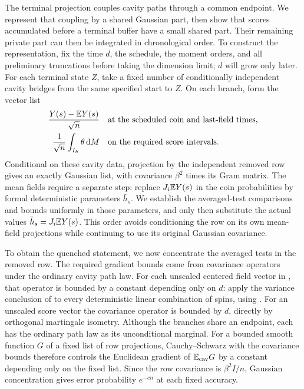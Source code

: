 The terminal projection couples cavity paths through a common endpoint.
We represent that coupling by a shared Gaussian part, then show that
scores accumulated before a terminal buffer have a small shared part.
Their remaining private part can then be integrated in chronological
order. To construct the representation, fix the time $d$, the schedule, the moment
orders, and all preliminary truncations before taking the dimension
limit; $d$ will grow only later.  For each terminal state $Z$, take a
fixed number of conditionally independent cavity bridges from the same
specified start to $Z$.  On each branch, form the vector list
\begin{equation}
 \begin{aligned}
 \frac{Y(s)-\mathbb E Y(s)}{\sqrt n}\quad
       &\text{at the scheduled coin and last-field times},\\
 \frac1{\sqrt n}\int_{I_h}\theta\,\mathrm d M
       \quad&\text{on the required score intervals}.
 \end{aligned}
 \label{eq:row-bridge-list}
\end{equation}
Conditional on these cavity data, projection by the independent removed
row gives an exactly Gaussian list, with covariance $\beta^2$ times
its Gram matrix.  The mean fields require a separate step: replace
$J_i\mathbb E Y(s)$ in the coin probabilities by formal deterministic
parameters $\bar h_s$.  We establish the averaged-test comparisons and
bounds uniformly in those parameters, and only then substitute the
actual values $\bar h_s=J_i\mathbb E Y(s)$.  This order avoids conditioning
the row on its own mean-field projections while continuing to use its
original Gaussian covariance.

To obtain the quenched statement, we now concentrate the averaged tests
in the removed row.  The required gradient bounds come from covariance
operators under the ordinary cavity path law.  For each unscaled
centered field vector in , that operator is
bounded by a constant depending only on $d$: apply the variance
conclusion of
 to every deterministic linear combination of spins,
using .  For an unscaled score vector the covariance
operator is bounded by $d$, directly by orthogonal martingale isometry.
Although the branches share an endpoint, each has the ordinary path law
as its unconditional marginal.  For a bounded smooth function $G$ of a
fixed list of row projections, Cauchy--Schwarz with the covariance
bounds therefore controls the Euclidean gradient of
$\mathbb E_{\mathrm{cav}}G$ by a constant depending only on the fixed list.
Since the row covariance is $\beta^2 I/n$, Gaussian concentration gives
error probability $e^{-c n}$ at each fixed accuracy.

